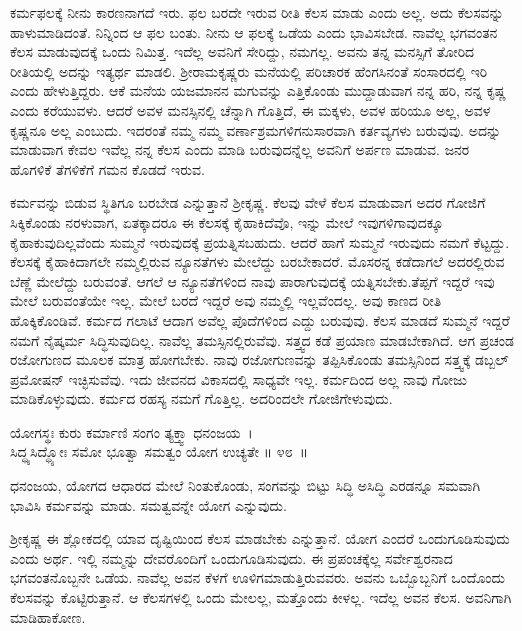 ಕರ್ಮಫಲಕ್ಕೆ ನೀನು ಕಾರಣನಾಗದೆ ಇರು. ಫಲ ಬರದೇ ಇರುವ ರೀತಿ ಕೆಲಸ ಮಾಡು ಎಂದು ಅಲ್ಲ. ಅದು ಕೆಲಸವನ್ನು ಹಾಳುಮಾಡಿದಂತೆ. ನಿನ್ನಿಂದ ಆ ಫಲ ಬಂತು. ನೀನು ಆ ಫಲಕ್ಕೆ ಒಡೆಯ ಎಂದು ಭಾವಿಸಬೇಡ. ನಾವೆಲ್ಲ ಭಗವಂತನ ಕೆಲಸ ಮಾಡುವುದಕ್ಕೆ ಒಂದು ನಿಮಿತ್ತ. ಇದೆಲ್ಲ ಅವನಿಗೆ ಸೇರಿದ್ದು, ನಮಗಲ್ಲ. ಅವನು ತನ್ನ ಮನಸ್ಸಿಗೆ ತೋರಿದ ರೀತಿಯಲ್ಲಿ ಅದನ್ನು ಇತ್ಯರ್ಥ ಮಾಡಲಿ. ಶ‍್ರೀರಾಮಕೃಷ್ಣರು ಮನೆಯಲ್ಲಿ ಪರಿಚಾರಕ ಹೆಂಗಸಿನಂತೆ ಸಂಸಾರದಲ್ಲಿ ಇರಿ ಎಂದು ಹೇಳುತ್ತಿದ್ದರು. ಆಕೆ ಮನೆಯ ಯಜಮಾನನ ಮಗುವನ್ನು ಎತ್ತಿಕೊಂಡು ಮುದ್ದಾಡುವಾಗ ನನ್ನ ಹರಿ, ನನ್ನ ಕೃಷ್ಣ ಎಂದು ಕರೆಯುವಳು. ಆದರೆ ಅವಳ ಮನಸ್ಸಿನಲ್ಲಿ ಚೆನ್ನಾಗಿ ಗೊತ್ತಿದೆ, ಈ ಮಕ್ಕಳು, ಅವಳ ಹರಿಯೂ ಅಲ್ಲ, ಅವಳ ಕೃಷ್ಣನೂ ಅಲ್ಲ ಎಂಬುದು. ಇದರಂತೆ ನಮ್ಮ ನಮ್ಮ ವರ್ಣಾಶ್ರಮಗಳಿಗನುಸಾರವಾಗಿ ಕರ್ತವ್ಯಗಳು ಬರುವುವು. ಅದನ್ನು ಮಾಡುವಾಗ ಕೇವಲ ಇವೆಲ್ಲ ನನ್ನ ಕೆಲಸ ಎಂದು ಮಾಡಿ ಬರುವುದನ್ನೆಲ್ಲ ಅವನಿಗೆ ಅರ್ಪಣ ಮಾಡುವ. ಜನರ ಹೊಗಳಿಕೆ ತೆಗಳಿಕೆಗೆ ಗಮನ ಕೊಡದೆ ಇರುವ.

ಕರ್ಮವನ್ನು ಬಿಡುವ ಸ್ಥಿತಿಗೂ ಬರಬೇಡ ಎನ್ನುತ್ತಾನೆ ಶ‍್ರೀಕೃಷ್ಣ. ಕೆಲವು ವೇಳೆ ಕೆಲಸ ಮಾಡುವಾಗ ಅದರ ಗೋಜಿಗೆ ಸಿಕ್ಕಿಕೊಂಡು ನರಳುವಾಗ, ಏತಕ್ಕಾದರೂ ಈ ಕೆಲಸಕ್ಕೆ ಕೈಹಾಕಿದೆವೊ, ಇನ್ನು ಮೇಲೆ ಇವುಗಳಿಗಾವುದಕ್ಕೂ ಕೈಹಾಕುವುದಿಲ್ಲವೆಂದು ಸುಮ್ಮನೆ ಇರುವುದಕ್ಕೆ ಪ್ರಯತ್ನಿಸಬಹುದು. ಆದರೆ ಹಾಗೆ ಸುಮ್ಮನೆ ಇರುವುದು ನಮಗೆ ಕೆಟ್ಟದ್ದು. ಕೆಲಸಕ್ಕೆ ಕೈಹಾಕಿದಾಗಲೇ ನಮ್ಮಲ್ಲಿರುವ ನ್ಯೂನತೆಗಳು ಮೇಲೆದ್ದು ಬರಬೇಕಾದರೆ. ಮೊಸರನ್ನ ಕಡೆದಾಗಲೆ ಅದರಲ್ಲಿರುವ ಬೆಣ್ಣೆ ಮೇಲೆದ್ದು ಬರುವಂತೆ. ಆಗಲೆ ಆ ನ್ಯೂನತೆಗಳಿಂದ ನಾವು ಪಾರಾಗುವುದಕ್ಕೆ ಯತ್ನಿಸಬೇಕು.\break ತೆಪ್ಪಗೆ ಇದ್ದರೆ ಇವು ಮೇಲೆ ಬರುವಂತೆಯೇ ಇಲ್ಲ. ಮೇಲೆ ಬರದೆ ಇದ್ದರೆ ಅವು ನಮ್ಮಲ್ಲಿ ಇಲ್ಲವೆಂದಲ್ಲ. ಅವು ಕಾಣದ ರೀತಿ ಹೊಕ್ಕಿಕೊಂಡಿವೆ. ಕರ್ಮದ ಗಲಾಟೆ ಆದಾಗ ಅವೆಲ್ಲ ಪೊದೆಗಳಿಂದ ಎದ್ದು ಬರುವುವು. ಕೆಲಸ ಮಾಡದೆ ಸುಮ್ಮನೆ ಇದ್ದರೆ ನಮಗೆ ನೈಷ್ಕರ್ಮ ಸಿದ್ಧಿಸುವುದಿಲ್ಲ. ನಾವೆಲ್ಲ ತಮಸ್ಸಿನಲ್ಲಿರುವೆವು. ಸತ್ತ್ವದ ಕಡೆ ಪ್ರಯಾಣ ಮಾಡಬೇಕಾಗಿದೆ. ಆಗ ಪ್ರಚಂಡ ರಜೋಗುಣದ ಮೂಲಕ ಮಾತ್ರ ಹೋಗಬೇಕು. ನಾವು ರಜೋಗುಣವನ್ನು ತಪ್ಪಿಸಿಕೊಂಡು ತಮಸ್ಸಿನಿಂದ ಸತ್ತ್ವಕ್ಕೆ ಡಬ್ಬಲ್ ಪ್ರಮೋಷನ್ ಇಚ್ಛಿಸುವೆವು. ಇದು ಜೀವನದ ವಿಕಾಸದಲ್ಲಿ ಸಾಧ್ಯವೇ ಇಲ್ಲ. ಕರ್ಮದಿಂದ ಅಲ್ಲ ನಾವು ಗೋಜು ಮಾಡಿಕೊಳ್ಳುವುದು. ಕರ್ಮದ ರಹಸ್ಯ ನಮಗೆ ಗೊತ್ತಿಲ್ಲ. ಅದರಿಂದಲೇ ಗೋಜಿಗೇಳುವುದು.

\begin{shloka}
ಯೋಗಸ್ಥಃ ಕುರು ಕರ್ಮಾಣಿ ಸಂಗಂ ತ್ಯಕ್ತ್ವಾ ಧನಂಜಯ~।\\ಸಿದ್ಧ್ಯಸಿದ್ಧ್ಯೋಃ ಸಮೋ ಭೂತ್ವಾ ಸಮತ್ವಂ ಯೋಗ ಉಚ್ಯತೇ \hfill॥ ೪೮~॥
\end{shloka}

\begin{artha}
ಧನಂಜಯ, ಯೋಗದ ಆಧಾರದ ಮೇಲೆ ನಿಂತುಕೊಂಡು, ಸಂಗವನ್ನು ಬಿಟ್ಟು ಸಿದ್ಧಿ ಅಸಿದ್ಧಿ ಎರಡನ್ನೂ ಸಮವಾಗಿ ಭಾವಿಸಿ ಕರ್ಮವನ್ನು ಮಾಡು. ಸಮತ್ವವನ್ನೇ ಯೋಗ ಎನ್ನುವುದು.
\end{artha}

ಶ‍್ರೀಕೃಷ್ಣ ಈ ಶ್ಲೋಕದಲ್ಲಿ ಯಾವ ದೃಷ್ಟಿಯಿಂದ ಕೆಲಸ ಮಾಡಬೇಕು ಎನ್ನುತ್ತಾನೆ. ಯೋಗ ಎಂದರೆ ಒಂದುಗೂಡಿಸುವುದು ಎಂದು ಅರ್ಥ. ಇಲ್ಲಿ ನಮ್ಮನ್ನು ದೇವರೊಂದಿಗೆ ಒಂದುಗೂಡಿಸುವುದು. ಈ ಪ್ರಪಂಚಕ್ಕೆಲ್ಲ ಸರ್ವೇಶ್ವರನಾದ ಭಗವಂತನೊಬ್ಬನೇ ಒಡೆಯ. ನಾವೆಲ್ಲ ಅವನ ಕೆಳಗೆ ಊಳಿಗಮಾಡುತ್ತಿರುವವರು. ಅವನು ಒಬ್ಬೊಬ್ಬನಿಗೆ ಒಂದೊಂದು ಕೆಲಸವನ್ನು ಕೊಟ್ಟಿರುತ್ತಾನೆ. ಆ ಕೆಲಸಗಳಲ್ಲಿ ಒಂದು ಮೇಲಲ್ಲ, ಮತ್ತೊಂದು ಕೀಳಲ್ಲ. ಇದೆಲ್ಲ ಅವನ ಕೆಲಸ. ಅವನಿಗಾಗಿ ಮಾಡಿಹಾಕೋಣ.

